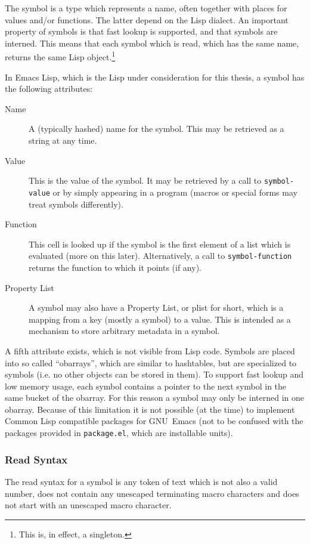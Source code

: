 \documentclass[a4paper,10pt,twoside]{report}
\newcommand{\el}{Emacs Lisp}
\newcommand{\cl}{Common Lisp}
\newcommand{\fun}[1]{\texttt{#1}}
\newcommand{\emacs}{GNU~Emacs}
\begin{document}
The symbol is a type which represents a name, often together with places for
values and/or functions.  The latter depend on the Lisp dialect.  An important
property of symbols is that fast lookup is supported, and that symbols are
interned.  This means that each symbol which is read, which has the same name,
returns the same Lisp object.\footnote{This is, in effect, a singleton.}

In \el{}, which is the Lisp under consideration for this thesis, a symbol has
the following attributes:

\begin{description}
\item[{Name}] A (typically hashed) name for the symbol.  This may be retrieved
  as a string at any time.
\item[{Value}] This is the value of the symbol.  It may be retrieved by a call
  to \fun{symbol-value} or by simply appearing in a program (macros or special
  forms may treat symbols differently).
\item[{Function}] This cell is looked up if the symbol is the first element of a
  list which is evaluated (more on this later).  Alternatively, a call to
  \fun{symbol-function} returns the function to which it points (if any).
\item[{Property List}] A symbol may also have a Property List, or plist for
  short, which is a mapping from a key (mostly a symbol) to a value.  This is
  intended as a mechanism to store arbitrary metadata in a symbol.
\end{description}

A fifth attribute exists, which is not visible from Lisp code.  Symbols are
placed into so called ``obarrays'', which are similar to hashtables, but are
specialized to symbols (i.e. no other objects can be stored in them).  To
support fast lookup and low memory usage, each symbol contains a pointer to the
next symbol in the same bucket of the obarray.  For this reason a symbol may
only be interned in one obarray.  Because of this limitation it is not possible
(at the time) to implement \cl{} compatible packages for \emacs{} (not to be
confused with the packages provided in \fun{package.el}, which are installable
units).

\subsubsection{Read Syntax}
\label{subsubsec:symbol-syntax}

The read syntax for a symbol is any token of text which is not also a valid
number, does not contain any unescaped terminating macro characters and does not
start with an unescaped macro character.
\end{document}
